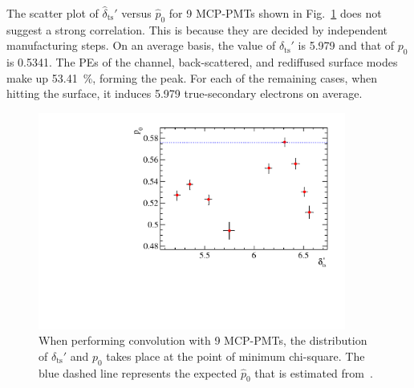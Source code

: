 The scatter plot of $\hat{\delta}_{\mathrm{ts}}'$ versus $\hat{p}_0$ for 9 MCP-PMTs shown in Fig.~\ref{fig:true_p} does not suggest a strong correlation. This is because they are decided by independent manufacturing steps. On an average basis, the value of $\delta_{\mathrm{ts}}'$ is 5.979 and that of $p_0$ is 0.5341. %
The PEs of the channel, back-scattered, and rediffused surface modes make up \SI{53.41}{\percent}, forming the peak. For each of the remaining cases, when hitting the surface, it induces 5.979 true-secondary electrons on average.
\begin{figure}[h]
	\centering
	\includegraphics[width=0.9\textwidth]{PMTRelated/GTmodel/true_p.pdf}
	\caption{When performing convolution with 9 MCP-PMTs, the distribution of $\delta_{\mathrm{ts}}'$ and $p_0$ takes place at the point of minimum chi-square. The blue dashed line represents the expected $\hat{p}_0$ that is estimated from~\cite{chen2018photoelectron}. }
	\label{fig:true_p}
\end{figure}

